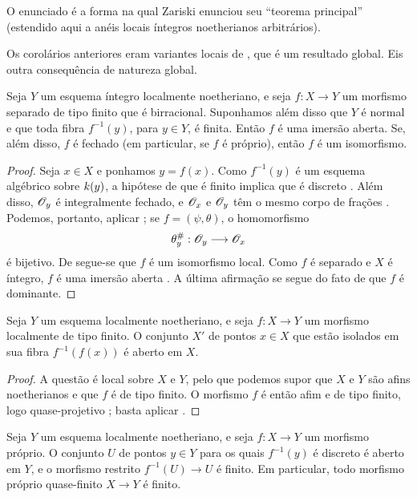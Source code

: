 O enunciado  é a forma na qual Zariski enunciou seu
``teorema principal'' (estendido aqui a anéis locais íntegros
noetherianos arbitrários).

Os corolários anteriores eram variantes locais de
, que é um resultado global. Eis outra
consequência de natureza global.

\begin{corollary}[4.4.9]
\label{III.4.4.9}
Seja $Y$ um esquema íntegro localmente noetheriano, e seja
$f:X\to Y$ um morfismo separado de tipo finito que é birracional.
Suponhamos além disso que $Y$ é normal e que toda fibra $f^{-1}(y)$,
para $y\in Y$, é finita. Então $f$ é uma imersão aberta. Se,
além disso, $f$ é fechado (em particular, se $f$ é próprio), então
$f$ é um isomorfismo.
\end{corollary}

\begin{proof}
Seja $x\in X$ e ponhamos $y=f(x)$. Como $f^{-1}(y)$ é um esquema
algébrico sobre $k(y)$, a hipótese de que é finito implica que
é discreto . Além disso, $\mathscr{O}_y$ é integralmente
fechado, e $\mathscr{O}_x$ e $\mathscr{O}_y$ têm o mesmo corpo de frações
. Podemos, portanto, aplicar
; se $f=(\psi,\theta)$, o homomorfismo
\[
  \theta_y^\#:\mathscr{O}_y\longrightarrow\mathscr{O}_x
\]
é bijetivo. De  segue-se que $f$ é um isomorfismo
local. Como $f$ é separado e $X$ é íntegro, $f$ é uma imersão
aberta . A última afirmação se segue do fato de
que $f$ é dominante.
\end{proof}

\begin{proposition}[4.4.10]
\label{III.4.4.10}
Seja $Y$ um esquema localmente noetheriano, e seja $f:X\to Y$ um
morfismo localmente de tipo finito. O conjunto $X'$ de pontos
$x\in X$ que estão isolados em sua fibra $f^{-1}(f(x))$ é aberto em
$X$.
\end{proposition}

\begin{proof}
A questão é local sobre $X$ e $Y$, pelo que podemos supor que
$X$ e $Y$ são afins noetherianos e que $f$ é de tipo finito. O
morfismo $f$ é então afim e de tipo finito, logo
quase-projetivo ; basta aplicar
.
\end{proof}


\begin{corollary}[4.4.11]
\label{III.4.4.11}
Seja $Y$ um esquema localmente noetheriano, e seja $f:X\to Y$ um
morfismo próprio. O conjunto $U$ de pontos $y\in Y$ para os quais
$f^{-1}(y)$ é discreto é aberto em $Y$, e o morfismo restrito
$f^{-1}(U)\to U$ é finito. Em particular, todo morfismo próprio
quase-finito $X\to Y$ é finito.
\end{corollary}

